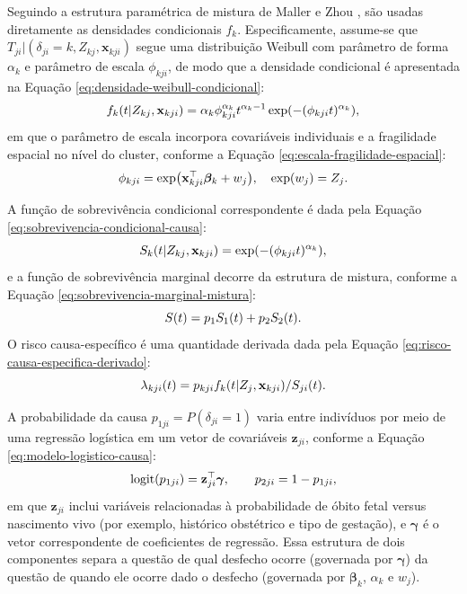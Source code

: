 Seguindo a estrutura paramétrica de mistura de Maller e Zhou \cite{maller2002},
são usadas diretamente as densidades condicionais $f_k$. Especificamente,
assume-se que $T_{ji}|(\delta_{ji}=k,Z_{kj},\mathbf{x}_{kji})$ segue uma distribuição
Weibull com parâmetro de forma $\alpha_k$ e parâmetro de escala $\phi_{kji}$,
de modo que a densidade condicional é apresentada na Equação \ref{eq:densidade-weibull-condicional}:
\begin{equation}
\lequation{Densidade Weibull condicional}
\label{eq:densidade-weibull-condicional}
f_k(t| Z_{kj},\mathbf{x}_{kji})=\alpha_k\phi_{kji}^{\alpha_k}t^{\alpha_k-1}
\exp(-(\phi_{kji}t)^{\alpha_k}),
\end{equation}
em que o parâmetro de escala incorpora covariáveis individuais e a fragilidade
espacial no nível do cluster, conforme a Equação \ref{eq:escala-fragilidade-espacial}:
\begin{equation}
\lequation{Parâmetro de escala com fragilidade espacial}
\label{eq:escala-fragilidade-espacial}
\phi_{kji}=\exp\bigl(\mathbf{x}_{kji}^{\top}\bm{\beta}_k+w_j\bigr),\quad \exp(w_j)=Z_j.
\end{equation}

A função de sobrevivência condicional correspondente é dada pela Equação \ref{eq:sobrevivencia-condicional-causa}:
\begin{equation}
\lequation{Sobrevivência condicional por causa}
\label{eq:sobrevivencia-condicional-causa}
S_k(t| Z_{kj},\mathbf{x}_{kji})=\exp(-(\phi_{kji}t)^{\alpha_k}),
\end{equation}
e a função de sobrevivência marginal decorre da estrutura de mistura, conforme a Equação \ref{eq:sobrevivencia-marginal-mistura}:
\begin{equation}
\lequation{Sobrevivência marginal da mistura}
\label{eq:sobrevivencia-marginal-mistura}
S(t)=p_1S_1(t)+p_2S_2(t).
\end{equation}
O risco causa-específico é uma quantidade derivada dada pela Equação \ref{eq:risco-causa-especifica-derivado}:
\begin{equation}
\lequation{Risco causa-específico derivado do modelo}
\label{eq:risco-causa-especifica-derivado}
\lambda_{kji}(t)=p_{kji}f_k(t| Z_j,\mathbf{x}_{kji})/S_{ji}(t).
\end{equation}

A probabilidade da causa $p_{1ji}=P(\delta_{ji}=1)$ varia entre indivíduos por
meio de uma regressão logística em um vetor de covariáveis $\mathbf{z}_{ji}$, conforme a Equação \ref{eq:modelo-logistico-causa}:
\begin{equation}
\lequation{Modelo logístico para probabilidade da causa}
\label{eq:modelo-logistico-causa}
\operatorname{logit}(p_{1ji})=\mathbf{z}_{ji}^{\top}\bm{\gamma},
\qquad
p_{2ji}=1-p_{1ji},
\end{equation}
em que $\mathbf{z}_{ji}$ inclui variáveis relacionadas à probabilidade de óbito fetal
versus nascimento vivo (por exemplo, histórico obstétrico e tipo de gestação), e
$\bm{\gamma}$ é o vetor correspondente de coeficientes de regressão. Essa estrutura de
dois componentes separa a questão de qual desfecho ocorre (governada por
$\bm{\gamma}$) da questão de quando ele ocorre dado o desfecho (governada por
$\bm{\beta}_k$, $\alpha_k$ e $w_j$).

